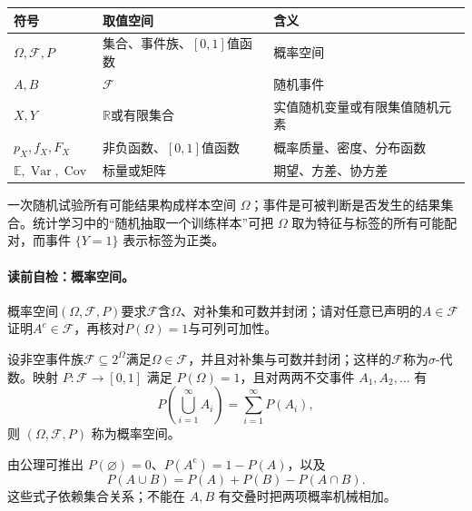 \label{struct:V1-C04-CH05}
\begin{symboltablebox}
\begin{tabularx}{\linewidth}{@{}l l X@{}}
\toprule 符号 & 取值空间 & 含义\\ \midrule
$\Omega,\mathcal F,P$ & 集合、事件族、$[0,1]$值函数 & 概率空间\\
$A,B$ & $\mathcal F$ & 随机事件\\
$X,Y$ & $\mathbb R$或有限集合 & 实值随机变量或有限集值随机元素\\
$p_X,f_X,F_X$ & 非负函数、$[0,1]$值函数 & 概率质量、密度、分布函数\\
$\mathbb E,\operatorname{Var},\operatorname{Cov}$ & 标量或矩阵 & 期望、方差、协方差\\
\bottomrule
\end{tabularx}
\end{symboltablebox}

\label{struct:V1-C04-CH06}
一次随机试验所有可能结果构成样本空间 $\Omega$；事件是可被判断是否发生的结果集合。统计学习中的“随机抽取一个训练样本”可把 $\Omega$ 取为特征与标签的所有可能配对，而事件 $\{Y=1\}$ 表示标签为正类。

\label{struct:V1-C04-CH07}
\paragraph{读前自检：概率空间。}概率空间$(\Omega,\mathcal F,P)$要求$\mathcal F$含$\Omega$、对补集和可数并封闭；请对任意已声明的$A\in\mathcal F$证明$A^c\in\mathcal F$，再核对$P(\Omega)=1$与可列可加性。\par

\begin{definition}[概率空间]
设非空事件族$\mathcal F\subseteq2^\Omega$满足$\Omega\in\mathcal F$，并且对补集与可数并封闭；这样的$\mathcal F$称为$\sigma$-代数。映射 $P:\mathcal F\to[0,1]$ 满足 $P(\Omega)=1$，且对两两不交事件 $A_1,A_2,\ldots$ 有
\[
P\!\left(\bigcup_{i=1}^{\infty}A_i\right)=\sum_{i=1}^{\infty}P(A_i),
\]
则 $(\Omega,\mathcal F,P)$ 称为概率空间。
\end{definition}
由公理可推出 $P(\varnothing)=0$、$P(A^{\mathrm c})=1-P(A)$，以及
\[
P(A\cup B)=P(A)+P(B)-P(A\cap B).
\]
这些式子依赖集合关系；不能在 $A,B$ 有交叠时把两项概率机械相加。

